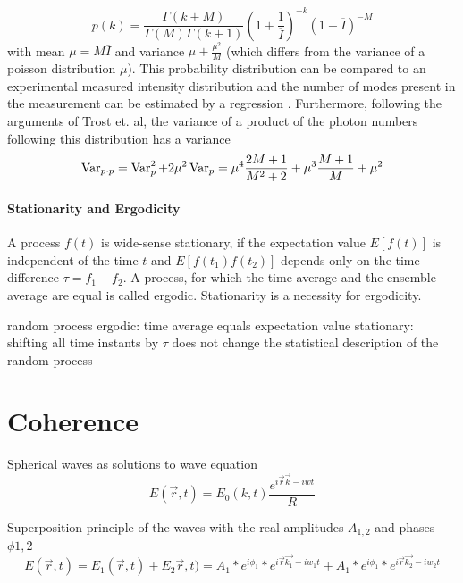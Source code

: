 \cite{trost2020,mandel1959,holmes2019}
\begin{equation}
p(k)=
\frac{\Gamma(k+M)}{\Gamma(M)\Gamma(k+1) }
\left( 1+\frac{1}{\overline{I}}
\right)^{-k}
\left( 1+\overline{I}
\right)^{-M}
\end{equation}
with mean $\mu=M\overline{I}$ and variance $\mu+\frac{\mu^2}{M}$ (which differs from the variance of a poisson distribution $\mu$).
This probability distribution can be compared to an experimental measured intensity distribution and the number of modes present in the measurement can be estimated by a regression \cite{lehmkuhler2014,yun2019}.
Furthermore, following the arguments of Trost et. al, the variance of a product of the photon numbers following this distribution has a variance 
\begin{equation}
	\operatorname{Var}_{p\cdot p}= \operatorname{Var}_p^2 +2 \mu^2\operatorname{Var}_p	= \mu^4 \frac{2 M + 1}{M^2 + 2}+ \mu^3 \frac{M+1}{M} + \mu^2
\end{equation}




\paragraph{Stationarity and Ergodicity}
A process $f(t)$ is wide-sense stationary, if the expectation value $E[f(t)]$ is independent of the time $t$ and $E[f(t_1)f(t_2)]$ depends only on the time difference $\tau=f_1-f_2$. A process, for which the time average and the ensemble average are equal is called ergodic. Stationarity is a necessity for ergodicity.

random process
ergodic: time average equals expectation value
stationary: shifting all time instants by $\tau$ does not change the statistical description of the random process 

\section{Coherence}
Spherical waves as  solutions to wave equation
\begin{equation}
	E(\vec{r},t)=E_0(k,t) \frac{e^{i\vec{r}\vec{k}-iwt}}{R}
	\end{equation}

Superposition principle of the waves with the real amplitudes $A_{1,2}$ and phases $\phi{1,2}$
\begin{equation}
E(\vec{r},t)=E_1(\vec{r},t)+E_2\vec{r},t)=A_1*e^{i\phi_1} * e^{i\vec{r}\vec{k_1}-iw_1t} + A_1*e^{i\phi_1} * e^{i\vec{r}\vec{k_2}-iw_2t} 
\end{equation} 





